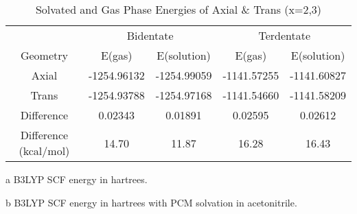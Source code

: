 \begin{table}[!h]
\centering
 \begin{threeparttable}
  \caption{Solvated and Gas Phase Energies of Axial \& Trans  (x=2,3)}
    \begin{tabular}{ccccc}
    \toprule
     & \multicolumn{2}{c}{Bidentate} & \multicolumn{2}{c}{Terdentate} \\ \cline{2-5} 
    Geometry & E(gas)\tnote{a} & E(solution)\tnote{b} & E(gas)\tnote{a} & E(solution)\tnote{b} \\ \midrule
    Axial & -1254.96132 & -1254.99059 & -1141.57255 & -1141.60827 \\
    Trans & -1254.93788 & -1254.97168 & -1141.54660 & -1141.58209 \\
    Difference & 0.02343 & 0.01891 & 0.02595 & 0.02612 \\  \midrule
    Difference (kcal/mol) & 14.70 & 11.87 & 16.28 & 16.43 \\
    \bottomrule
    \end{tabular}%
    \begin{tablenotes}
    \item [a] B3LYP SCF energy in hartrees.
    \item [b] B3LYP SCF energy in hartrees with PCM solvation in acetonitrile.
    \end{tablenotes}
  \label{tab.cneng}%
 \end{threeparttable}
\end{table}%



